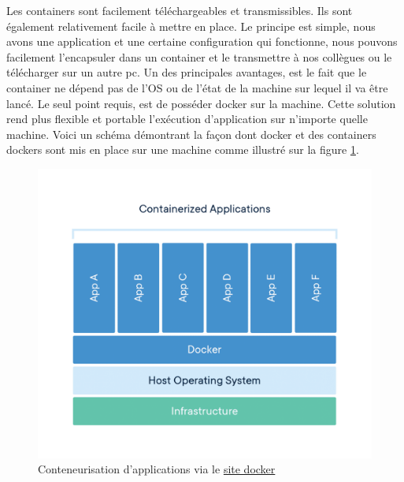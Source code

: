 \documentclass[
    iai, %
    il, %
]{heig-tb}
\begin{document}
Les containers sont facilement téléchargeables et transmissibles. Ils sont également relativement facile à mettre en place.\newline
Le principe est simple, nous avons une application et une certaine configuration qui fonctionne, nous pouvons facilement l'encapsuler dans un container et le transmettre à nos collègues ou le télécharger sur un autre pc.\newline
Un des principales avantages, est le fait que le container ne dépend pas de l'OS ou de l'état de la machine sur lequel il va être lancé.\newline
Le seul point requis, est de posséder docker sur la machine.\newline
Cette solution rend plus flexible et portable l'exécution d'application sur n'importe quelle machine.\newline
Voici un schéma démontrant la façon dont docker et des containers dockers sont mis en place sur une
machine comme illustré sur la figure \ref{docker-container-app}.

\begin{center}
    \begin{figure}
        \includegraphics[width=\textwidth]{./assets/figures/container-what-is-container.png}
        \caption[Conteneurisation d'applications]{Conteneurisation d'applications via
            le \href{https://www.docker.com/wp-content/uploads/2021/11/container-what-is-container.png}{site docker}
            \label{docker-container-app}}
    \end{figure}
\end{center}
\end{document}
